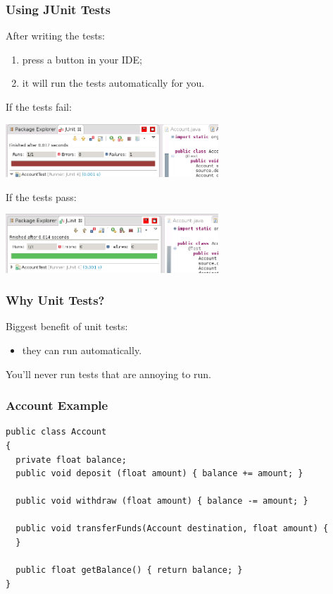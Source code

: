 \begin{frame}
\frametitle{Using JUnit Tests}

\begin{changemargin}{1cm}

After writing the tests:
\begin{enumerate}
\item press a button in your IDE;
\item it will run the tests automatically for you.
\end{enumerate}
\end{changemargin}

If the tests fail:

\begin{center}
\includegraphics[width=0.6\textwidth]{images/fail.png}
\end{center}

If the tests pass:

\begin{center}
\includegraphics[width=0.6\textwidth]{images/pass.png}
\end{center}

\end{frame}

\begin{frame}
\frametitle{Why Unit Tests?}

\begin{changemargin}{1cm}
Biggest benefit of unit tests:
\begin{itemize}
\item they can run automatically.
\end{itemize}
You'll never run tests that are annoying to run.

\end{changemargin}
\end{frame}


\begin{frame}[fragile]
\frametitle{Account Example}
\begin{changemargin}{1cm}
{\scriptsize
\begin{verbatim}
public class Account
{
  private float balance;
  public void deposit (float amount) { balance += amount; }

  public void withdraw (float amount) { balance -= amount; }

  public void transferFunds(Account destination, float amount) {
  }

  public float getBalance() { return balance; }
}
\end{verbatim}
}
\end{changemargin}
\end{frame}

